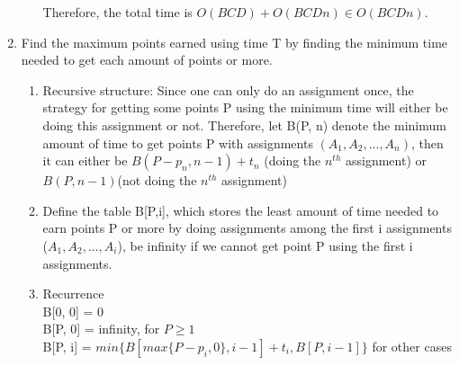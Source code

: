 \documentclass[11pt]{article}
\begin{document}
\begin{enumerate}
\begin{enumerate}
    Therefore, the total time is $O(BCD)+O(BCDn)\in O(BCDn)$.
    \end{enumerate}

    \newpage
    \item
    Find the maximum points earned using time T by finding the minimum time needed to get each amount of points or more.\\
    \begin{enumerate}
        \item Recursive structure: Since one can only do an assignment once, the strategy for getting some points P using the minimum time will either be doing this assignment or not. Therefore, let B(P, n) denote the minimum amount of time to get points P with assignments $(A_1, A_2, ..., A_n)$, then it can either be $B(P-p_n, n-1)+ t_n$ (doing the $n^{th}$ assignment) or $B(P, n-1)$(not doing the $n^{th}$ assignment)\\
        \item Define the table B[P,i], which stores the least amount of time needed to earn points P or more by doing assignments among the first i assignments ($A_1, A_2, ..., A_i$), be infinity if we cannot get point P using the first i assignments.\\
        \item Recurrence\\
            B[0, 0] = 0\\
            B[P, 0] = infinity,  for $P \geq 1$\\
            B[P, i] = $min\{B[ max\{P-p_i, 0\}, i-1] + t_i, B[P, i-1]\}$ for other cases\\
            

\end{enumerate}
\end{enumerate}
\end{document}
